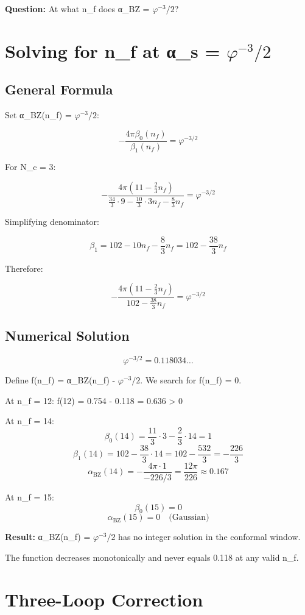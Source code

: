 \documentclass{article}
\begin{document}
\textbf{Question:} At what n_f does α_BZ = $\varphi^{-3}/2$?

\section{Solving for n_f at α_s = $\varphi^{-3}/2$}

\subsection{General Formula}

Set α_BZ(n_f) = $\varphi^{-3}/2$:

\[
-\frac{4\pi\beta_0(n_f)}{\beta_1(n_f)} = \varphi^{-3/2}
\]

For N_c = 3:

\[
-\frac{4\pi(11 - \frac{2}{3}n_f)}{\frac{34}{3} \cdot 9 - \frac{10}{3} \cdot 3 n_f - \frac{8}{3}n_f} = \varphi^{-3/2}
\]

Simplifying denominator:

\[
\beta_1 = 102 - 10n_f - \frac{8}{3}n_f = 102 - \frac{38}{3}n_f
\]

Therefore:

\[
-\frac{4\pi(11 - \frac{2}{3}n_f)}{102 - \frac{38}{3}n_f} = \varphi^{-3/2}
\]

\subsection{Numerical Solution}

\[
\varphi^{-3/2} = 0.118034 \ldots
\]

Define f(n_f) = α_BZ(n_f) - $\varphi^{-3}/2$. We search for f(n_f) = 0.

At n_f = 12: f(12) = 0.754 - 0.118 = 0.636 > 0

At n_f = 14:
\[
\beta_0(14) = \frac{11}{3} \cdot 3 - \frac{2}{3} \cdot 14 = 1
\]
\[
\beta_1(14) = 102 - \frac{38}{3} \cdot 14 = 102 - \frac{532}{3} = -\frac{226}{3}
\]
\[
\alpha_{\text{BZ}}(14) = -\frac{4\pi \cdot 1}{-226/3} = \frac{12\pi}{226} \approx 0.167
\]

At n_f = 15:
\[
\beta_0(15) = 0
\]
\[
\alpha_{\text{BZ}}(15) = 0 \quad \text{(Gaussian)}
\]

\textbf{Result:} α_BZ(n_f) = $\varphi^{-3}/2$ has no integer solution in the conformal window.

The function decreases monotonically and never equals 0.118 at any valid n_f.

\section{Three-Loop Correction}
\end{document}
